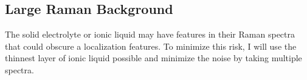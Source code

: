 \documentclass[11pt]{article}
\begin{document}
\begin{multicols}{2}
\subsection{Large Raman Background}
The solid electrolyte or ionic liquid may have features in their Raman spectra that could obscure a localization features. To minimize this risk, I will use the thinnest layer of ionic liquid possible and minimize the noise by taking multiple spectra.

\begin{comment}
\subsubsection{Fabrication}

The notional fabrication process will be:

\begin{itemize}
	\item Exfoliate \rucl using scotch tape onto 300 nm SiO\textsubscript{2} on Si chips using O\textsubscript{2} plasma and heat
	\item Select and characterize flakes using optical and atomic force microscopy
	\item Write and evaporate bond pads and coplanar gate using optical lithography (ML3 direct write system in flex cleanroom)
	\item Write and develop ohmic contact pattern via electron beam lithography
	\item Argon milling to reduce contact resistance
	\item Evaporate Ti/Au contacts
	\item Deposit thin layer of alumina dielectric
	\item Dry liftoff
\end{itemize}

\subsubsection{Measurement}

The notional measurement process will be:

\begin{itemize}
	\item Measure resistivity as a function of temperature at zero field without ionic liquid applied
	\item Measure R\textsubscript{xx} and R\textsubscript{xy} as a function of temperature without ionic liquid applied
	\item Measure R\textsubscript{xx} and R\textsubscript{xy} as a function of temperature and gate voltage
\end{itemize}


\end{comment}
\end{multicols}
\end{document}
